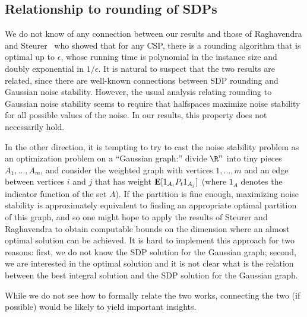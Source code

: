 \documentclass{toc}
\newcommand{\E}{{\bf E}}
\begin{document}
\subsection{Relationship to rounding of SDPs}
We do not know of any connection between our results and those of Raghavendra and Steurer~\cite{RaghavendraSteurer:09} who showed that for any CSP, there is a rounding algorithm that is optimal up to $\epsilon$, whose running time is polynomial in the instance size and doubly exponential in $1/\epsilon$. 
It is natural to suspect that the two results are related, since there are well-known connections between SDP rounding and Gaussian noise stability.
However, the usual analysis relating rounding to Gaussian noise stability seems
to require that halfspaces maximize noise stability for all possible values of
the noise. In our results, this property does not necessarily hold.

In the other direction, it is tempting to try to cast the noise stability
problem as an optimization problem on a ``Gaussian graph:'' divide $\R^n$
into %
%
%
tiny pieces $A_1, \dots, A_m$, and consider the weighted  %
graph with vertices $1, \dots, m$ and an edge between vertices $i$ and $j$
that has weight $\E [1_{A_{i}} P_t 1_{A_j}]$ (where $1_A$ denotes the indicator
function of the set $A$). If the partition is fine enough, maximizing noise
stability is approximately equivalent to finding an appropriate optimal
partition of this graph, and so one might hope to apply the
results of Steurer and Raghavendra to obtain computable bounds on the dimension
where an almost optimal solution can be achieved. It is hard to implement this
approach for two reasons: first, we do not know the SDP solution for the
Gaussian graph; second, we are interested in the optimal solution and it is not
clear what is the relation between the best integral solution and the SDP
solution for the Gaussian graph. 

While we do not see how to formally relate the two works, connecting the two
(if possible) would be likely to yield important insights.
\end{document}
